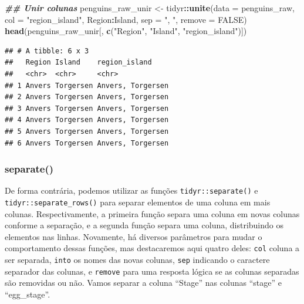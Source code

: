 \documentclass[
]{article}
\newenvironment{Shaded}{\begin{snugshade}}{\end{snugshade}}
\newcommand{\AttributeTok}[1]{\textcolor[rgb]{0.13,0.29,0.53}{#1}}
\newcommand{\ConstantTok}[1]{\textcolor[rgb]{0.56,0.35,0.01}{#1}}
\newcommand{\DocumentationTok}[1]{\textcolor[rgb]{0.56,0.35,0.01}{\textbf{\textit{#1}}}}
\newcommand{\FunctionTok}[1]{\textcolor[rgb]{0.13,0.29,0.53}{\textbf{#1}}}
\newcommand{\NormalTok}[1]{#1}
\newcommand{\OtherTok}[1]{\textcolor[rgb]{0.56,0.35,0.01}{#1}}
\newcommand{\SpecialCharTok}[1]{\textcolor[rgb]{0.81,0.36,0.00}{\textbf{#1}}}
\newcommand{\StringTok}[1]{\textcolor[rgb]{0.31,0.60,0.02}{#1}}
\begin{document}
\begin{Shaded}
\begin{Highlighting}[]
\DocumentationTok{\#\# Unir colunas}
\NormalTok{penguins\_raw\_unir }\OtherTok{\textless{}{-}}\NormalTok{ tidyr}\SpecialCharTok{::}\FunctionTok{unite}\NormalTok{(}\AttributeTok{data =}\NormalTok{ penguins\_raw, }
                                  \AttributeTok{col =} \StringTok{"region\_island"}\NormalTok{,}
\NormalTok{                                  Region}\SpecialCharTok{:}\NormalTok{Island, }
                                  \AttributeTok{sep =} \StringTok{", "}\NormalTok{,}
                                  \AttributeTok{remove =} \ConstantTok{FALSE}\NormalTok{)}
\FunctionTok{head}\NormalTok{(penguins\_raw\_unir[, }\FunctionTok{c}\NormalTok{(}\StringTok{"Region"}\NormalTok{, }\StringTok{"Island"}\NormalTok{, }\StringTok{"region\_island"}\NormalTok{)])}
\end{Highlighting}
\end{Shaded}

\begin{verbatim}
## # A tibble: 6 x 3
##   Region Island    region_island    
##   <chr>  <chr>     <chr>            
## 1 Anvers Torgersen Anvers, Torgersen
## 2 Anvers Torgersen Anvers, Torgersen
## 3 Anvers Torgersen Anvers, Torgersen
## 4 Anvers Torgersen Anvers, Torgersen
## 5 Anvers Torgersen Anvers, Torgersen
## 6 Anvers Torgersen Anvers, Torgersen
\end{verbatim}

\hypertarget{separate}{%
\subsubsection{separate()}\label{separate}}

De forma contrária, podemos utilizar as funções \texttt{tidyr::separate()} e \texttt{tidyr::separate\_rows()} para separar elementos de uma coluna em mais colunas. Respectivamente, a primeira função separa uma coluna em novas colunas conforme a separação, e a segunda função separa uma coluna, distribuindo os elementos nas linhas. Novamente, há diversos parâmetros para mudar o comportamento dessas funções, mas destacaremos aqui quatro deles: \texttt{col} coluna a ser separada, \texttt{into} os nomes das novas colunas, \texttt{sep} indicando o caractere separador das colunas, e \texttt{remove} para uma resposta lógica se as colunas separadas são removidas ou não. Vamos separar a coluna ``Stage'' nas colunas ``stage'' e ``egg\_stage''.
\end{document}
